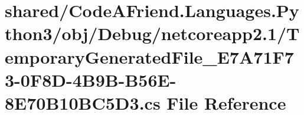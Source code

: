 \hypertarget{shared_2_code_a_friend_8_languages_8_python3_2obj_2_debug_2netcoreapp2_81_2_temporary_generated_c072098bafafb7f2b1a4e63389ba1b0a}{}\section{shared/\+Code\+A\+Friend.Languages.\+Python3/obj/\+Debug/netcoreapp2.1/\+Temporary\+Generated\+File\+\_\+\+E7\+A71\+F73-\/0\+F8\+D-\/4\+B9\+B-\/\+B56\+E-\/8\+E70\+B10\+B\+C5\+D3.cs File Reference}
\label{shared_2_code_a_friend_8_languages_8_python3_2obj_2_debug_2netcoreapp2_81_2_temporary_generated_c072098bafafb7f2b1a4e63389ba1b0a}
